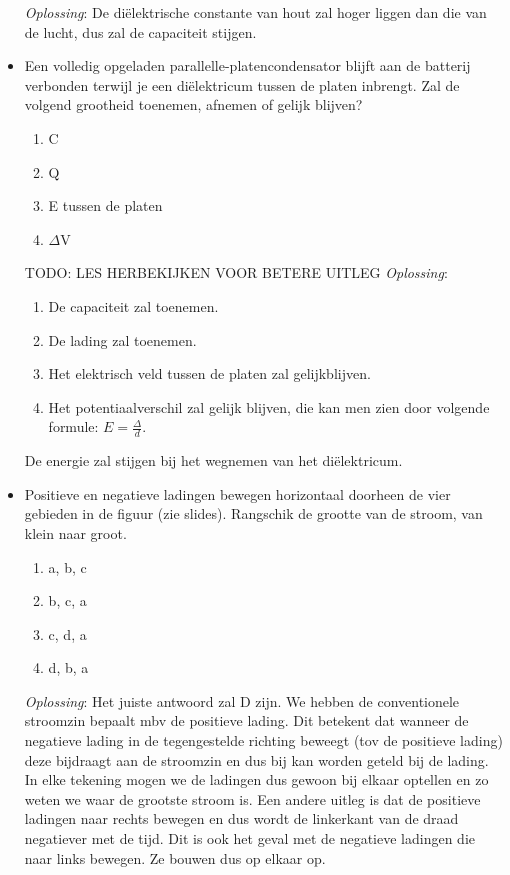 \documentclass[12pt,a4paper]{article}
\begin{document}
\begin{itemize}
	\textit{Oplossing}: De diëlektrische constante van hout zal hoger liggen dan die van de lucht, dus zal de capaciteit stijgen. 
	\item Een volledig opgeladen parallelle-platencondensator blijft aan de batterij verbonden terwijl je een diëlektricum tussen de platen inbrengt. Zal de volgend grootheid toenemen, afnemen of gelijk blijven?
	\begin{enumerate}[label= \alph*]
		\item C
		\item Q
		\item E tussen de platen
		\item $\Delta$V
	\end{enumerate}
TODO: LES HERBEKIJKEN VOOR BETERE UITLEG
	\textit{Oplossing}:
	\begin{enumerate}[label=\alph*]
		\item De capaciteit zal toenemen. 
		\item De lading zal toenemen. 
		\item Het elektrisch veld tussen de platen zal gelijkblijven. 
		\item Het potentiaalverschil zal gelijk blijven, die kan men zien door volgende formule: \(E = \frac{\Delta}{d}\).
	\end{enumerate}
	De energie zal stijgen bij het wegnemen van het diëlektricum. 
	\item Positieve en negatieve ladingen bewegen horizontaal doorheen de vier gebieden in de figuur (zie slides). Rangschik de grootte van de stroom, van klein naar groot. 
	\begin{enumerate}[label=\alph*]
		\item a, b, c
		\item b, c, a
		\item c, d, a
		\item d, b, a
	\end{enumerate}
	\textit{Oplossing}: Het juiste antwoord zal D zijn. We hebben de conventionele stroomzin bepaalt mbv de positieve lading. Dit betekent dat wanneer de negatieve lading in de tegengestelde richting beweegt (tov de positieve lading) deze bijdraagt aan de stroomzin en dus bij kan worden geteld bij de lading. In elke tekening mogen we de ladingen dus gewoon bij elkaar optellen en zo weten we waar de grootste stroom is. Een andere uitleg is dat de positieve ladingen naar rechts bewegen en dus wordt de linkerkant van de draad negatiever met de tijd. Dit is ook het geval met de negatieve ladingen die naar links bewegen. Ze bouwen dus op elkaar op. 

\end{itemize}
\end{document}
